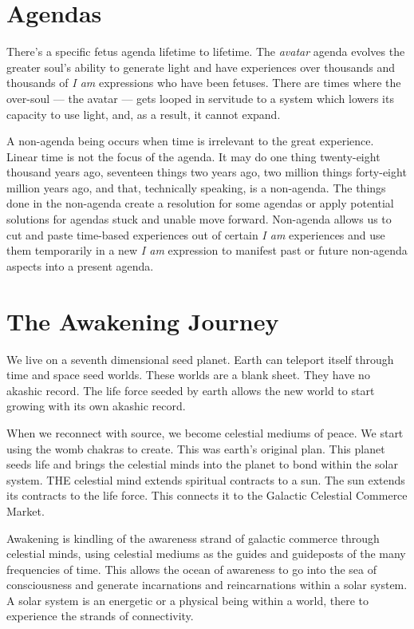 \documentclass[letterpaper,9pt,twoside,titlepage,onecolumn,openany]{book}
\begin{document}
\section*{Agendas}\label{agendas}

There's a specific fetus agenda lifetime to lifetime. The \emph{avatar}
agenda evolves the greater soul's ability to generate light and have
experiences over thousands and thousands of \emph{I am} expressions who
have been fetuses. There are times where the over-soul --- the avatar
--- gets looped in servitude to a system which lowers its capacity to
use light, and, as a result, it cannot expand.

A non-agenda being occurs when time is irrelevant to the great
experience. Linear time is not the focus of the agenda. It may do one
thing twenty-eight thousand years ago, seventeen things two years ago,
two million things forty-eight million years ago, and that, technically
speaking, is a non-agenda. The things done in the non-agenda create a
resolution for some agendas or apply potential solutions for agendas
stuck and unable move forward. Non-agenda allows us to cut and paste
time-based experiences out of certain \emph{I am} experiences and use
them temporarily in a new \emph{I am} expression to manifest past or
future non-agenda aspects into a present agenda.

\section*{The Awakening Journey}\label{the-awakening-journey}

We live on a seventh dimensional seed planet. Earth can teleport itself
through time and space seed worlds. These worlds are a blank sheet. They
have no akashic record. The life force seeded by earth allows the new
world to start growing with its own akashic record.

When we reconnect with source, we become celestial mediums of peace. We
start using the womb chakras to create. This was earth's original plan.
This planet seeds life and brings the celestial minds into the planet to
bond within the solar system. THE celestial mind extends spiritual
contracts to a sun. The sun extends its contracts to the life force.
This connects it to the Galactic Celestial Commerce Market.

Awakening is kindling of the awareness strand of galactic commerce
through celestial minds, using celestial mediums as the guides and
guideposts of the many frequencies of time. This allows the ocean of
awareness to go into the sea of consciousness and generate incarnations
and reincarnations within a solar system. A solar system is an energetic
or a physical being within a world, there to experience the strands of
connectivity.
\end{document}

